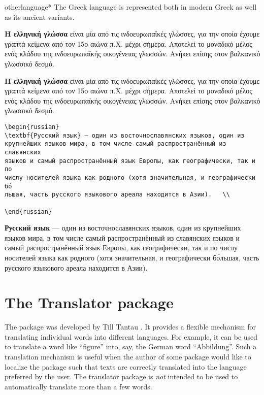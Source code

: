 \begin{docCommandd}{otherlanguage*} { }
The Greek language is represented both in modern Greek as well as its ancient variants.

\begin{phdverbatim}
\begin{greek}
\textbf{Η ελληνική γλώσσα} είναι μία από τις ινδοευρωπαϊκές γλώσσες, για την
οποία έχουμε γραπτά κείμενα από τον 15ο αιώνα π.Χ. μέχρι σήμερα. Αποτελεί το
μοναδικό μέλος ενός κλάδου της ινδοευρωπαϊκής οικογένειας γλωσσών. Ανήκει
επίσης στον βαλκανικό γλωσσικό δεσμό.\\	
\end{greek}
\end{phdverbatim}

\topline

\textbf{Η ελληνική γλώσσα} είναι μία από τις ινδοευρωπαϊκές γλώσσες, για την
οποία έχουμε γραπτά κείμενα από τον 15ο αιώνα π.Χ. μέχρι σήμερα. Αποτελεί το
μοναδικό μέλος ενός κλάδου της ινδοευρωπαϊκής οικογένειας γλωσσών. Ανήκει
επίσης στον βαλκανικό γλωσσικό δεσμό.\\	

\bottomline

\begin{verbatim}
\begin{russian}
\textbf{Русский язык} — один из восточнославянских языков, один из 
крупнейших языков мира, в том числе самый распространённый из славянских
языков и самый распространённый язык Европы, как географически, так и по
числу носителей языка как родного (хотя значительная, и географически бо́
льшая, часть русского языкового ареала находится в Азии).	\\

\end{russian}
\end{verbatim}



\textbf{Русский язык} — один из восточнославянских языков, один из крупнейших языков мира, в том числе самый распространённый из славянских языков и самый распространённый язык Европы, как географически, так и по числу носителей языка как родного (хотя значительная, и географически бо́льшая, часть русского языкового ареала находится в Азии).	\\


\section{The Translator package}

The  package was developed by Till Tantau \cite{translator}. It provides a flexible
mechanism for translating individual words into different languages.
For example, it can be used to translate a word like \enquote{figure} into,
say, the German word \enquote{Abbildung}. Such a translation mechanism is
useful when the author of some package would like to localize the
package such that texts are correctly translated into the language
preferred by the user. The translator package is \emph{not} intended
to be used to automatically translate more than a few words. 


\end{docCommandd}

